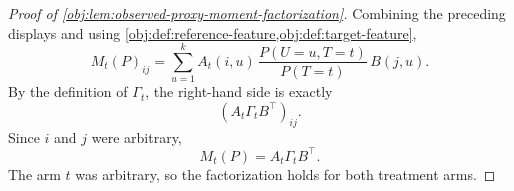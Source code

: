 \begin{proof}[Proof of \cref{obj:lem:observed-proxy-moment-factorization}]
Combining the preceding displays and using \cref{obj:def:reference-feature,obj:def:target-feature},
\[
M_t(P)_{ij}
=
\sum_{u=1}^{k}
A_t(i,u)\,
\frac{P(U=u,T=t)}{P(T=t)}\,
B(j,u).
\]
By the definition of \(\Gamma_t\), the right-hand side is exactly
\[
(A_t\Gamma_tB^\top)_{ij}.
\]
Since \(i\) and \(j\) were arbitrary,
\[
M_t(P)=A_t\Gamma_tB^\top .
\]
The arm \(t\) was arbitrary, so the factorization holds for both treatment arms.
\end{proof}
